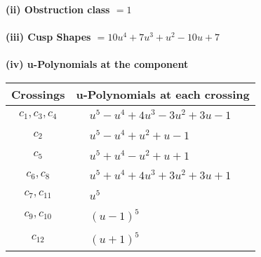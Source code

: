 \documentclass[1p]{elsarticle_modified}
\theoremstyle{definition}
\begin{document}
\flushleft \textbf{(ii) Obstruction class $= 1$}\\~\\
\flushleft \textbf{(iii) Cusp Shapes $= 10 u^4+7 u^3+u^2-10 u+7$}\\~\\
\newpage\renewcommand{\arraystretch}{1}
\flushleft \textbf{(iv) u-Polynomials at the component}\newline \\
\begin{tabular}{m{50pt}|m{274pt}}
Crossings & \hspace{64pt}u-Polynomials at each crossing \\
\hline $$\begin{aligned}c_{1},c_{3},c_{4}\end{aligned}$$&$\begin{aligned}
&u^5- u^4+4 u^3-3 u^2+3 u-1
\end{aligned}$\\
\hline $$\begin{aligned}c_{2}\end{aligned}$$&$\begin{aligned}
&u^5- u^4+u^2+u-1
\end{aligned}$\\
\hline $$\begin{aligned}c_{5}\end{aligned}$$&$\begin{aligned}
&u^5+u^4- u^2+u+1
\end{aligned}$\\
\hline $$\begin{aligned}c_{6},c_{8}\end{aligned}$$&$\begin{aligned}
&u^5+u^4+4 u^3+3 u^2+3 u+1
\end{aligned}$\\
\hline $$\begin{aligned}c_{7},c_{11}\end{aligned}$$&$\begin{aligned}
&u^5
\end{aligned}$\\
\hline $$\begin{aligned}c_{9},c_{10}\end{aligned}$$&$\begin{aligned}
&(u-1)^5
\end{aligned}$\\
\hline $$\begin{aligned}c_{12}\end{aligned}$$&$\begin{aligned}
&(u+1)^5
\end{aligned}$\\
\hline
\end{tabular}\\~\\
\end{document}
